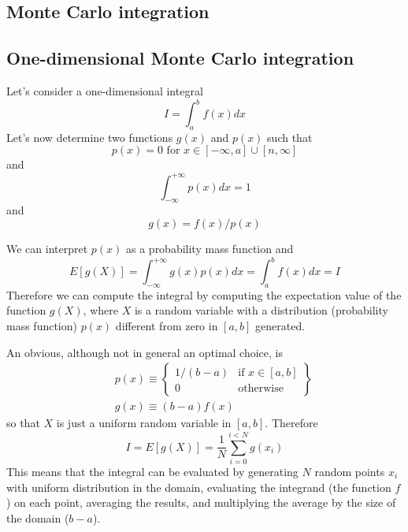 \documentclass[justified, sixbynine]{tufte-book}
\theoremstyle{plain}%
\newtheorem * {corollary}{Corollary}
\theoremstyle{definition}
\theoremstyle{remark}
\newtheorem * {remark}{Remark}
\newtheorem * {note}{Note}
\begin{document}
\begin{fullwidth}
\section{Monte Carlo integration}

\goodbreak\subsection{One-dimensional Monte Carlo integration}

Let's consider a one-dimensional integral
\begin{equation}
I=\int_a^bf(x)dx
\end{equation}
Let's now determine two functions $g(x)$ and $p(x)$ such that
\begin{equation}
p(x)=0\text{ for }x\in [-\infty , a]\cup [n, \infty ]
\end{equation}
and
\begin{equation}
\int_{-\infty }^{+\infty }p(x)dx=1
\end{equation}
and
\begin{equation}
g(x)=f(x)/p(x)
\end{equation}

We can interpret $p(x)$ as a probability mass function and
\begin{equation}
E[g(X)]=\int_{-\infty }^{+\infty }g(x)p(x)dx=\int_a^bf(x)dx=I
\end{equation}
Therefore we can compute the integral by computing the expectation value of
the function $g(X)$, where $X$ is a random variable with a distribution
(probability mass function) $p(x)$ different from zero in $[a, b]$ generated.

An obvious, although not in general an optimal choice, is
\begin{eqnarray}
&&p(x)\equiv \left\{
\begin{array}{ll}
1/(b-a) & \text{if }x\in [a, b] \\
0 & \text{otherwise}
\end{array}
\right\}   \label{defchoice} \\
&&g(x)\equiv (b-a)f(x)  \nonumber
\end{eqnarray}
so that $X$ is just a uniform random variable in $[a, b]$. Therefore
\begin{equation}
I=E\left[ g(X)\right] =\frac1N \sum_{i=0}^{i<N}g(x_i)
\end{equation}
This means that the integral can be evaluated by generating $N$ random
points $x_i$ with uniform distribution in the domain, evaluating the
integrand (the function $f$) on each point, averaging the results, and
multiplying the average by the size of the domain ($b-a$).


\end{fullwidth}
\end{document}
